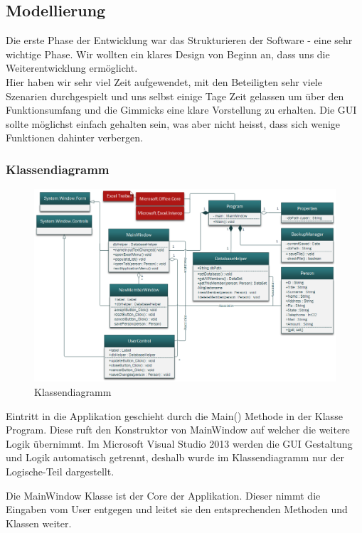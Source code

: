 \documentclass{article}
\begin{document}
\subsection{Modellierung}
Die erste Phase der Entwicklung war das Strukturieren der Software - eine sehr wichtige Phase. Wir wollten ein klares Design von Beginn an, dass uns die Weiterentwicklung ermöglicht.\\
Hier haben wir sehr viel Zeit aufgewendet, mit den Beteiligten sehr viele Szenarien durchgespielt und uns selbst einige Tage Zeit gelassen um über den Funktionsumfang und die Gimmicks eine klare Vorstellung zu erhalten. Die GUI sollte möglichst einfach gehalten sein, was aber nicht heisst, dass sich wenige Funktionen dahinter verbergen. 

\subsubsection{Klassendiagramm}
	
\begin{figure}[h]
	\centering
	\includegraphics[width=1.05 \textwidth]{KlassendiagrammBild}
	\caption{Klassendiagramm}
\end{figure}

Eintritt in die Applikation geschieht durch die Main() Methode in der Klasse Program. Diese ruft den Konstruktor von MainWindow auf welcher die weitere Logik übernimmt. Im Microsoft Visual Studio 2013 werden die GUI Gestaltung und Logik automatisch getrennt, deshalb wurde im Klassendiagramm nur der Logische-Teil dargestellt.

Die MainWindow Klasse ist der Core der Applikation. Dieser nimmt die Eingaben vom User entgegen und leitet sie den entsprechenden Methoden und Klassen weiter. 
\end{document}
